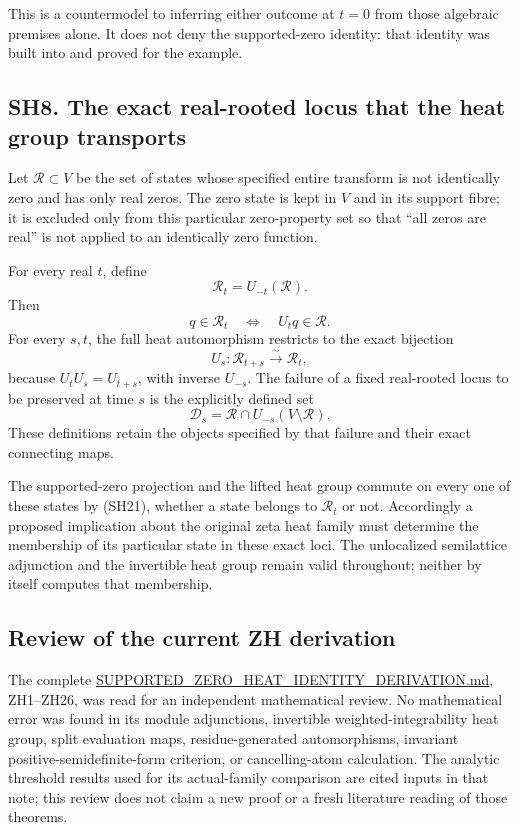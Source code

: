 \documentclass[
]{article}
\begin{document}
This is a countermodel to inferring either outcome at \(t=0\) from those
algebraic premises alone. It does not deny the supported-zero identity:
that identity was built into and proved for the example.

\subsection{SH8. The exact real-rooted locus that the heat group
transports}\label{sh8.-the-exact-real-rooted-locus-that-the-heat-group-transports}

Let \(\mathcal R\subset V\) be the set of states whose specified entire
transform is not identically zero and has only real zeros. The zero
state is kept in \(V\) and in its support fibre; it is excluded only
from this particular zero-property set so that ``all zeros are real'' is
not applied to an identically zero function.

For every real \(t\), define \[
\mathcal R_t=U_{-t}(\mathcal R).
\tag{SH30}
\] Then \[
q\in\mathcal R_t\quad\Longleftrightarrow\quad U_tq\in\mathcal R.
\] For every \(s,t\), the full heat automorphism restricts to the exact
bijection \[
U_s:\mathcal R_{t+s}\xrightarrow{\sim}\mathcal R_t,
\tag{SH31}
\] because \(U_tU_s=U_{t+s}\), with inverse \(U_{-s}\). The failure of a
fixed real-rooted locus to be preserved at time \(s\) is the explicitly
defined set \[
\mathcal D_s=\mathcal R\cap U_{-s}(V\setminus\mathcal R).
\tag{SH32}
\] These definitions retain the objects specified by that failure and
their exact connecting maps.

The supported-zero projection and the lifted heat group commute on every
one of these states by (SH21), whether a state belongs to
\(\mathcal R_t\) or not. Accordingly a proposed implication about the
original zeta heat family must determine the membership of its
particular state in these exact loci. The unlocalized semilattice
adjunction and the invertible heat group remain valid throughout;
neither by itself computes that membership.

\subsection{Review of the current ZH
derivation}\label{review-of-the-current-zh-derivation}

The complete
\href{../SUPPORTED_ZERO_HEAT_IDENTITY_DERIVATION.md}{SUPPORTED\_ZERO\_HEAT\_IDENTITY\_DERIVATION.md},
ZH1--ZH26, was read for an independent mathematical review. No
mathematical error was found in its module adjunctions, invertible
weighted-integrability heat group, split evaluation maps,
residue-generated automorphisms, invariant positive-semidefinite-form
criterion, or cancelling-atom calculation. The analytic threshold
results used for its actual-family comparison are cited inputs in that
note; this review does not claim a new proof or a fresh literature
reading of those theorems.
\end{document}
